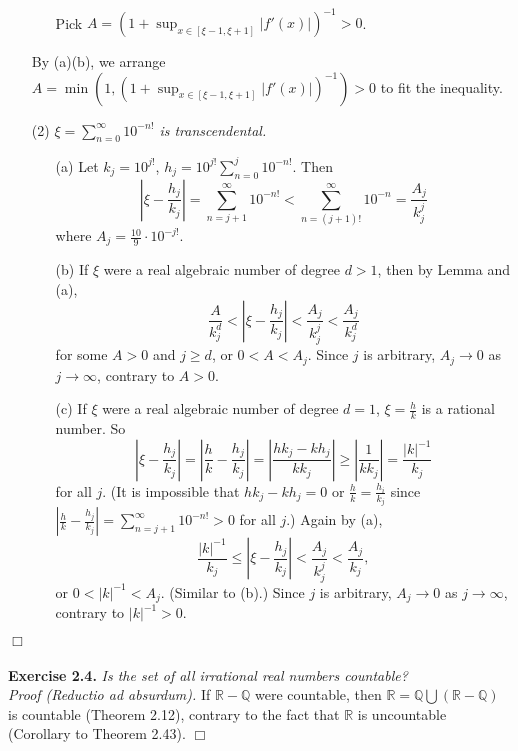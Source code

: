 \documentclass{article}
\begin{document}
\begin{enumerate}
\begin{enumerate}
\begin{align*}
\end{align*}
Pick $A = (1 + \sup_{x \in [\xi - 1, \xi + 1]}|f'(x)|)^{-1} > 0$.
\end{enumerate}
By (a)(b), we arrange
$A = \min(1, (1 + \sup_{x \in [\xi - 1, \xi + 1]}|f'(x)|)^{-1}) > 0$
to fit the inequality.
\item[(2)]
\emph{$\xi = \sum_{n=0}^{\infty} 10^{-n!}$ is transcendental.}
\begin{enumerate}
\item[(a)]
Let $k_j = 10^{j!}$, $h_j = 10^{j!} \sum_{n=0}^{j} 10^{-n!}$.
Then
$$\left| \xi - \frac{h_j}{k_j} \right|
= \sum_{n=j+1}^{\infty} 10^{-n!}
< \sum_{n=(j+1)!}^{\infty} 10^{-n}
= \frac{A_j}{k_j^{j}}
$$
where $A_j = \frac{10}{9} \cdot 10^{-j!}$.
\item[(b)]
If $\xi$ were a real algebraic number of degree $d > 1$,
then by Lemma and (a),
$$\frac{A}{k_j^{d}}
< \left| \xi - \frac{h_j}{k_j} \right|
< \frac{A_j}{k_j^{j}}
< \frac{A_j}{k_j^{d}}$$
for some $A > 0$ and $j \geq d$,
or $0 < A < A_j$.
Since $j$ is arbitrary,
$A_j \rightarrow 0$ as $j \rightarrow \infty$,
contrary to $A > 0$.
\item[(c)]
If $\xi$ were a real algebraic number of degree $d = 1$,
$\xi = \frac{h}{k}$ is a rational number.
So
$$\left| \xi - \frac{h_j}{k_j} \right|
= \left| \frac{h}{k} - \frac{h_j}{k_j} \right|
= \left| \frac{h k_j - k h_j}{k k_j} \right|
\geq \left| \frac{1}{k k_j} \right|
= \frac{|k|^{-1}}{k_j}$$
for all $j$.
(It is impossible that $h k_j - k h_j = 0$ or $\frac{h}{k} = \frac{h_i}{k_j}$
since $| \frac{h}{k} - \frac{h_j}{k_j} | = \sum_{n=j+1}^{\infty} 10^{-n!} > 0$ for all $j$.)
Again by (a),
$$\frac{|k|^{-1}}{k_j}
\leq \left| \xi - \frac{h_j}{k_j} \right|
< \frac{A_j}{k_j^{j}}
< \frac{A_j}{k_j},$$
or $0 < |k|^{-1} < A_j$.
(Similar to (b).)
Since $j$ is arbitrary,
$A_j \rightarrow 0$ as $j \rightarrow \infty$,
contrary to $|k|^{-1} > 0$.
\end{enumerate}
\end{enumerate}
$\Box$ \\\\






\textbf{Exercise 2.4.}
\emph{Is the set of all irrational real numbers countable?} \\

\emph{Proof (Reductio ad absurdum).}
If $\mathbb{R}-\mathbb{Q}$ were countable,
then $\mathbb{R} = \mathbb{Q} \bigcup (\mathbb{R}-\mathbb{Q})$ is countable
(Theorem 2.12),
contrary to the fact that
$\mathbb{R}$ is uncountable (Corollary to Theorem 2.43).
$\Box$ \\\\
\end{document}
